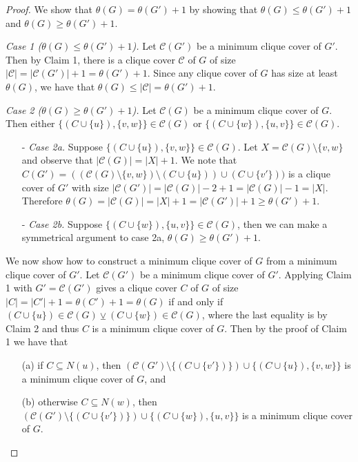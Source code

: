 \documentclass[../techreport.tex]{subfiles}
\begin{document}
\begin{proof}
	We show that $\theta(G) = \theta(G') + 1$ by showing that $\theta(G) \leq \theta(G') + 1$ and $\theta(G) \geq \theta(G') + 1$.

	\noindent\emph{Case 1 ($\theta(G) \leq \theta(G') + 1$).} Let $\mathcal{C}(G')$ be a minimum clique cover of $G'$. Then by Claim 1, there is a clique cover $\mathcal{C}$ of $G$ of size $|\mathcal{C}| = |\mathcal{C}(G')| + 1 = \theta(G') + 1$. Since any clique cover of $G$ has size at least $\theta(G)$, we have that $\theta(G) \leq |\mathcal{C}| = \theta(G') + 1$. 

	\noindent\emph{Case 2 ($\theta(G) \geq \theta(G') + 1$).} Let $\mathcal{C}(G)$ be a minimum clique cover of $G$. Then either $\{(C \cup \{u\}), \{v, w\}\} \in \mathcal{C}(G)$ or $\{(C \cup \{w\}), \{u, v\}\} \in \mathcal{C}(G)$.
	\begin{itemize}
		\item[-]\emph{Case 2a.} Suppose $\{(C \cup \{u\}), \{v, w\}\} \in \mathcal{C}(G)$. Let $X = \mathcal{C}(G) \setminus \{v, w\}$ and observe that $|\mathcal{C}(G)| = |X| + 1$. We note that $C(G') = ((\mathcal{C}(G) \setminus \{v, w\}) \setminus (C \cup \{u\})) \cup (C \cup \{v'\}))$ is a clique cover of $G'$ with size $|\mathcal{C}(G')| = |\mathcal{C}(G)| - 2 + 1 = |\mathcal{C}(G)| - 1 = |X|$. Therefore $\theta(G) = |\mathcal{C}(G)| = |X| + 1 = |\mathcal{C}(G')| + 1 \geq \theta(G') + 1$.

		\item[-]\emph{Case 2b.} Suppose $\{(C \cup \{w\}), \{u, v\}\} \in \mathcal{C}(G)$, then we can make a symmetrical argument to case 2a, $\theta(G) \geq \theta(G') + 1$.
	\end{itemize}

	We now show how to construct a minimum clique cover of $G$ from a minimum clique cover of $G'$. Let $\mathcal{C}(G')$ be a minimum clique cover of $G'$. Applying Claim 1 with $G' = \mathcal{C}(G')$ gives a clique cover $C$ of $G$ of size $|C| = |C'| + 1 = \theta(C') + 1 = \theta(G)$ if and only if $(C \cup \{u\}) \in \mathcal{C}(G) \veebar (C \cup \{w\}) \in \mathcal{C}(G)$, where the last equality is by Claim 2 and thus $C$ is a minimum clique cover of $G$. Then by the proof of Claim 1 we have that
	\begin{itemize}
		\item[(a)] if $C \subseteq N(u)$, then $(\mathcal{C}(G') \setminus \{(C \cup \{v'\})\}) \cup \{(C \cup \{u\}), \{v, w\}\}$ is a minimum clique cover of $G$, and

		\item[(b)] otherwise $C \subseteq N(w)$, then $(\mathcal{C}(G') \setminus \{(C \cup \{v'\})\}) \cup \{(C \cup \{w\}), \{u, v\}\}$ is a minimum clique cover of $G$.
	\end{itemize}
\end{proof}
\end{document}
